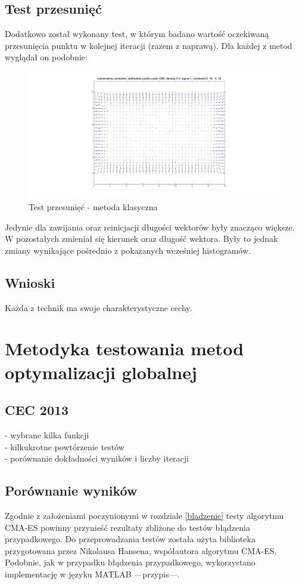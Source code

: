 \documentclass{mini}
\begin{document}
\subsection{Test przesunięć}
Dodatkowo został wykonany test, w którym badano wartość oczekiwaną przesunięcia punktu w kolejnej iteracji (razem z naprawą). Dla każdej z metod wyglądał on podobnie:

\begin{figure}[H]
\centering
\includegraphics[width=\textwidth]{conservative2dprzesuniecie}
\caption{Test przesunięć - metoda klasyczna}
\end{figure}

Jedynie dla zawijania oraz reinicjacji długości wektorów były znacząco większe. W pozostałych zmieniał się kierunek oraz długość wektora. Były to jednak zmiany wynikające pośrednio z pokazanych wcześniej histogramów.

\subsection{Wnioski}
Każda z technik ma swoje charakterystyczne cechy.

\pagebreak

\section{Metodyka testowania metod optymalizacji globalnej}

\subsection{CEC 2013}
- wybrane kilka funkcji\\
- kilkukrotne powtórzenie testów\\
- porównanie dokładności wyników i liczby iteracji

\subsection{Porównanie wyników}
Zgodnie z założeniami poczynionymi w rozdziale \ref{bladzenie} testy algorytmu CMA-ES powinny przynieść rezultaty zbliżone do testów błądzenia przypadkowego. Do przeprowadzania testów została użyta biblioteka przygotowana przez Nikolausa Hansena, współautora algorytmu CMA-ES. Podobnie, jak w przypadku błądzenia przypadkowego, wykorzystano implementację w języku MATLAB ---przypis---.
\end{document}
